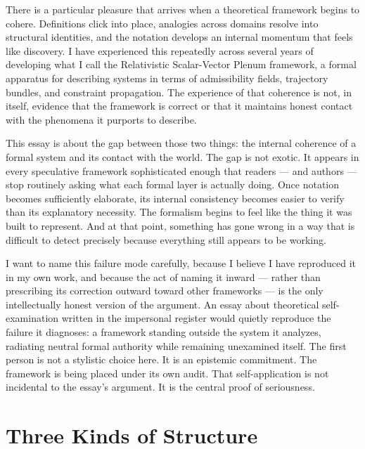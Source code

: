 \documentclass[12pt, a4paper]{article}
\begin{document}
There is a particular pleasure that arrives when a theoretical framework begins to cohere. Definitions click into place, analogies across domains resolve into structural identities, and the notation develops an internal momentum that feels like discovery. I have experienced this repeatedly across several years of developing what I call the Relativistic Scalar-Vector Plenum framework, a formal apparatus for describing systems in terms of admissibility fields, trajectory bundles, and constraint propagation. The experience of that coherence is not, in itself, evidence that the framework is correct or that it maintains honest contact with the phenomena it purports to describe.

This essay is about the gap between those two things: the internal coherence of a formal system and its contact with the world. The gap is not exotic. It appears in every speculative framework sophisticated enough that readers --- and authors --- stop routinely asking what each formal layer is actually doing. Once notation becomes sufficiently elaborate, its internal consistency becomes easier to verify than its explanatory necessity. The formalism begins to feel like the thing it was built to represent. And at that point, something has gone wrong in a way that is difficult to detect precisely because everything still appears to be working.

I want to name this failure mode carefully, because I believe I have reproduced it in my own work, and because the act of naming it inward --- rather than prescribing its correction outward toward other frameworks --- is the only intellectually honest version of the argument. An essay about theoretical self-examination written in the impersonal register would quietly reproduce the failure it diagnoses: a framework standing outside the system it analyzes, radiating neutral formal authority while remaining unexamined itself. The first person is not a stylistic choice here. It is an epistemic commitment. The framework is being placed under its own audit. That self-application is not incidental to the essay's argument. It is the central proof of seriousness.

\section{Three Kinds of Structure}
\end{document}
